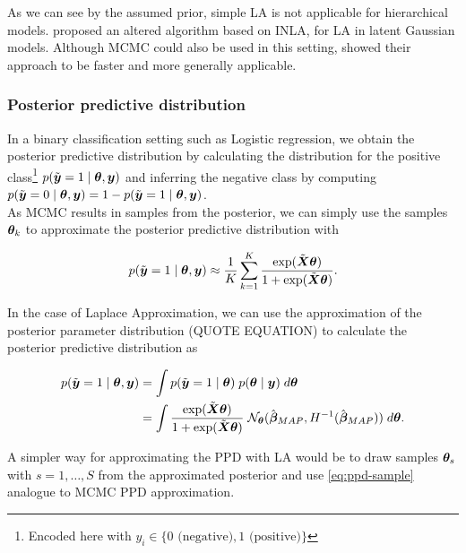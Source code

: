 As we can see by the assumed prior, simple LA is not applicable for hierarchical models. \citet{rue_approximate_2009} proposed an altered algorithm based on INLA, for LA in latent Gaussian models. Although MCMC could also be used in this setting, \citet{rue_approximate_2009} showed their approach to be faster and more generally applicable.


\subsubsection*{Posterior predictive distribution}

In a binary classification setting such as Logistic regression, we obtain the posterior predictive distribution by calculating the distribution for the positive class\footnote{
    Encoded here with $y_i \in \{0 \text{ (negative)}, 1 \text{ (positive)}\}$
} $p(\tilde{\bm{y}} = 1 \mid \bm{\theta}, \bm{y})$ and inferring the negative class by computing $p(\tilde{\bm{y}} = 0 \mid \bm{\theta}, \bm{y}) = 1 - p(\tilde{\bm{y}} = 1 \mid \bm{\theta}, \bm{y})$.\\

As MCMC results in samples from the posterior, we can simply use the samples $\bm{\theta}_k$ to approximate the posterior predictive distribution with

\begin{equation}\label{eq:ppd-sample}
    p(\tilde{\bm{y}} = 1 \mid \bm{\theta}, \bm{y}) \approx \frac{1}{K} \sum_{k=1}^{K} \frac{\exp({\tilde{\bm{X}} \bm{\theta}})}{1 + \exp({\tilde{\bm{X}} \bm{\theta}})}.
\end{equation}

In the case of Laplace Approximation, we can use the approximation of the posterior parameter distribution (QUOTE EQUATION) to calculate the posterior predictive distribution as

\begin{equation*}
    \begin{aligned}
        p(\tilde{\bm{y}} = 1 \mid \bm{\theta}, \bm{y}) &= \int p(\tilde{\bm{y}} = 1 \mid \bm{\theta}) \; p(\bm{\theta} \mid \bm{y}) \; d \bm{\theta} \\
        &= \int \frac{\exp(\tilde{\bm{X}} \bm{\theta})}{1 + \exp(\tilde{\bm{X}} \bm{\theta})} \; \mathcal{N}_{\bm{\theta}}(\hat{\bm{\beta}}_{MAP}, H^{-1} (\hat{\bm{\beta}}_{MAP})) \; d \bm{\theta}.
    \end{aligned}
\end{equation*}

A simpler way for approximating the PPD with LA would be to draw samples $\bm{\theta}_s$ with $s = 1, \dots, S$ from the approximated posterior and use \eqref{eq:ppd-sample} analogue to MCMC PPD approximation. 




